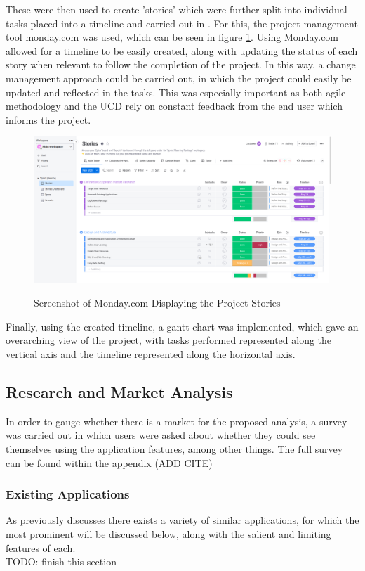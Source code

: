 \documentclass[12pt]{article}
\begin{document}
	These were then used to create 'stories' which were further split into individual tasks placed into a timeline and carried out in . For this, the project management tool monday.com \cite{MondayHome2021} was used, which can be seen in figure \ref{fig:monday.com}. Using Monday.com allowed for a timeline to be easily created, along with updating the status of each story when relevant to follow the completion of the project. In this way, a change management approach \cite{kierominIntroductionChangeManagement2020} could be carried out, in which the project could easily be updated and reflected in the tasks. This was especially important as both agile methodology and the UCD rely on constant feedback from the end user which informs the project.
	
	\begin{figure}[H]
		\centering
		\includegraphics[scale=0.25]{images/monday.png}
		\caption{Screenshot of Monday.com Displaying the Project Stories}
		\label{fig:monday.com}
		\cite{MondayHome2021}
	\end{figure}

	Finally, using the created timeline, a gantt chart was implemented, which gave an overarching view of the project, with tasks performed represented along the vertical axis and the timeline represented along the horizontal axis.
	
	\subsection{Research and Market Analysis}
	\label{market-analysis}
	In order to gauge whether there is a market for the proposed analysis, a survey was carried out in which users were asked about whether they could see themselves using the application features, among other things. The full survey can be found within the appendix (ADD CITE)
	
	\subsubsection{Existing Applications}
	As previously discusses there exists a variety of similar applications, for which the most prominent will be discussed below, along with the salient and limiting features of each.
	\\
	TODO: finish this section
	
\end{document}
